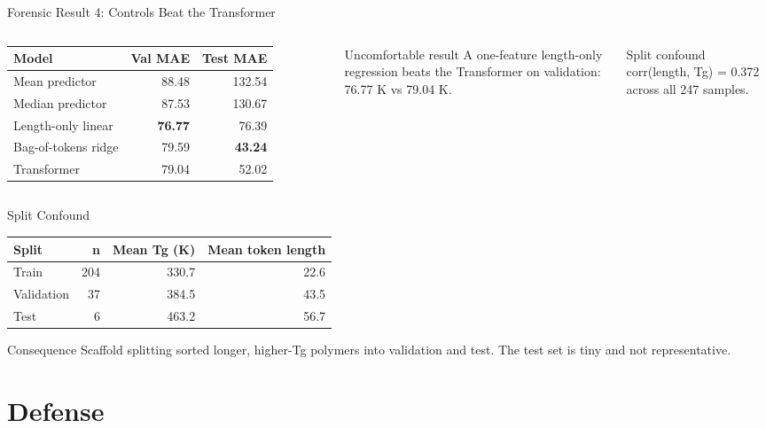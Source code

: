 \documentclass[aspectratio=169,10pt]{beamer}
\begin{document}
\begin{frame}{Forensic Result 4: Controls Beat the Transformer}
\begin{columns}[T,totalwidth=\textwidth]
\begin{tabular}{@{}lrr@{}}
\toprule
Model & Val MAE & Test MAE\\
\midrule
Mean predictor & 88.48 & 132.54\\
Median predictor & 87.53 & 130.67\\
Length-only linear & \textbf{76.77} & 76.39\\
Bag-of-tokens ridge & 79.59 & \textbf{43.24}\\
Transformer & 79.04 & 52.02\\
\bottomrule
\end{tabular}
\begin{alertblock}{Uncomfortable result}
A one-feature length-only regression beats the Transformer on validation: 76.77 K vs 79.04 K.
\end{alertblock}
\begin{block}{Split confound}
corr(length, Tg) = 0.372 across all 247 samples.
\end{block}
\end{columns}
\end{frame}

\begin{frame}{Split Confound}
\begin{tabular}{@{}lrrr@{}}
\toprule
Split & n & Mean Tg (K) & Mean token length\\
\midrule
Train & 204 & 330.7 & 22.6\\
Validation & 37 & 384.5 & 43.5\\
Test & 6 & 463.2 & 56.7\\
\bottomrule
\end{tabular}

\vspace{1em}
\begin{alertblock}{Consequence}
Scaffold splitting sorted longer, higher-Tg polymers into validation and test. The test set is tiny and not representative.
\end{alertblock}
\end{frame}

\section{Defense}
\end{document}
